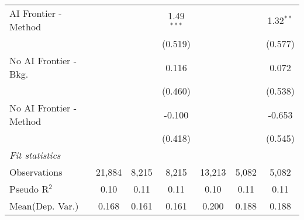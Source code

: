 \begin{tabular}{lcccccc}
   AI Frontier - Method    &               &               & 1.49$^{***}$ &               &              & 1.32$^{**}$\\   
                           &               &               & (0.519)      &               &              & (0.577)\\   
   No AI Frontier - Bkg.   &               &               & 0.116        &               &              & 0.072\\   
                           &               &               & (0.460)      &               &              & (0.538)\\   
   No AI Frontier - Method &               &               & -0.100       &               &              & -0.653\\   
                           &               &               & (0.418)      &               &              & (0.545)\\   
   \midrule
   \emph{Fit statistics}\\
   Observations            & 21,884        & 8,215         & 8,215        & 13,213        & 5,082        & 5,082\\  
   Pseudo R$^2$            & 0.10          & 0.11          & 0.11         & 0.10          & 0.11         & 0.11\\  
Mean(Dep. Var.) & 0.168 & 0.161 & 0.161 & 0.200 & 0.188 & 0.188 \\
   

\end{tabular}
